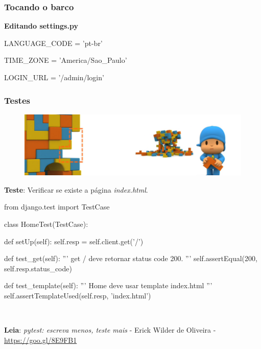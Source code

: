 \documentclass[aspectratio=169]{beamer}
\begin{document}
\begin{frame}[fragile]\frametitle{Tocando o barco}

\textbf{Editando settings.py}

\begin{pythoncode}
	LANGUAGE_CODE = 'pt-br'

	TIME_ZONE = 'America/Sao_Paulo'

	LOGIN_URL = '/admin/login'
\end{pythoncode}


\end{frame}


\begin{frame}\frametitle{Testes}

	\begin{figure}[h]
	  \centering
  		\includegraphics[width=.9\paperwidth]{img/teste03.png}
	\end{figure}

\end{frame}

\begin{frame}[fragile]

\textbf{Teste}: Verificar se existe a p\'agina \textit{index.html}.

\begin{pythoncode}
	from django.test import TestCase

	class HomeTest(TestCase):

	    def setUp(self):
	        self.resp = self.client.get('/')

	    def test_get(self):
	        ''' get / deve retornar status code 200. '''
	        self.assertEqual(200, self.resp.status_code)

	    def test_template(self):
	        ''' Home deve usar template index.html '''
	        self.assertTemplateUsed(self.resp, 'index.html')
\end{pythoncode}

\

\textbf{Leia}: \textit{pytest: escreva menos, teste mais} - Erick Wilder de Oliveira - \url{https://goo.gl/8E9FB1} 

\end{frame}
\end{document}
